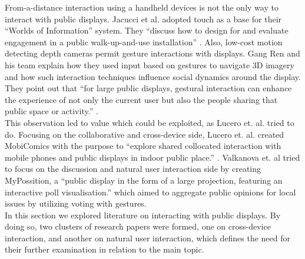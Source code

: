 From-a-distance interaction using a handheld devices is not the only way to interact with public displays. Jacucci et al. adopted touch as a base for their “Worlds of Information” system. They “discuss how to design for and evaluate engagement in a public walk-up-and-use installation” \cite{Jacucci:2010}. Also, low-cost motion detecting depth cameras permit gesture interactions with displays. Gang Ren and his team explain how they used input based on gestures to navigate 3D imagery and how such interaction techniques influence social dynamics around the display. They point out that “for large public displays, gestural interaction can enhance the experience of not only the current user but also the people sharing that public space or activity.” \cite{Ren:2013}.
\\
This observation led to value which could be exploited, as Lucero et. al. tried to do. Focusing on the collaborative and cross-device side, Lucero et. al. created MobiComics with the purpose to “explore shared collocated interaction with mobile phones and public displays in indoor public place.” \cite{Lucero:2012}. Valkanova et. al tried to focus on the discussion and natural user interaction side by creating MyPossition, a “public display in the form of a large projection, featuring an interactive poll visualisation.” \cite{Valkanova:2014} which aimed to aggregate public opinions for local issues by utilizing voting with gestures.\\

In this section we explored literature on interacting with public displays. By doing so, two clusters of research papers were formed, one on cross-device interaction, and another on natural user interaction, which defines the need for their further examination in relation to the main topic.
